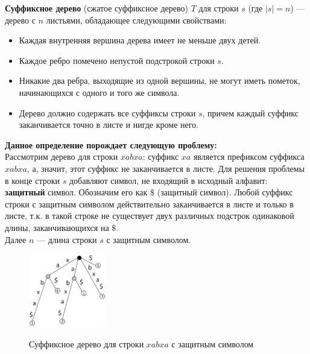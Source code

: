     \begin{definition}  
        \textbf{Суффиксное дерево} (сжатое суффиксное дерево) $T$ для строки $s$ (где $|s|=n$) — дерево с $n$ листьями, обладающее следующими свойствами:
        \begin{itemize}
            \item Каждая внутренняя вершина дерева имеет не меньше двух детей.
            \item Каждое ребро помечено непустой подстрокой строки $s$.
            \item Никакие два ребра, выходящие из одной вершины, не могут иметь пометок, начинающихся с одного и того же символа.
            \item Дерево должно содержать все суффиксы строки $s$, причем каждый суффикс заканчивается точно в листе и нигде кроме него.
        \end{itemize}
    \end{definition}

    
\textbf{Данное определение порождает следующую проблему:}\\

Рассмотрим дерево для строки $xabxa$: суффикс $xa$ является префиксом суффикса $xabxa$, а, значит, этот суффикс не заканчивается в листе. Для решения проблемы в конце строки $s$ добавляют символ, не входящий в исходный алфавит: \textbf{защитный} символ. Обозначим его как $\$$ (защитный символ). Любой суффикс строки с защитным символом действительно заканчивается в листе и только в листе, т.к. в такой строке не существует двух различных подстрок одинаковой длины, заканчивающихся на $\$$.\\

Далее $n$ — длина строки $s$ с защитным символом.

\begin{figure}[H]
        \centering
        \includegraphics[width=0.3\textwidth]{images/chapter12/Suffix_tree_3.png}
        \label{fig:images/chapter12/Suffix_tree_3.png}
        \caption{Суффиксное дерево для строки $xabxa$
 с защитным символом}
\end{figure}

